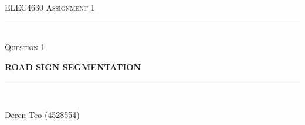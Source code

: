 \begin{titlepage}
    \centering

    \textsc{ELEC4630 Assignment 1}\\
    \vspace{9cm}

    \rule{\linewidth}{0.5pt}\\

    \vspace{1em}
    \LARGE\textsc{Question 1}\\
    \vspace{1em}

    \LARGE\uppercase{\textbf{{Road Sign Segmentation}}}\\

    \rule{\linewidth}{2pt}\\

    \vfill

    \normalsize{Deren Teo (4528554)}
    \vspace{1cm}

\end{titlepage}


